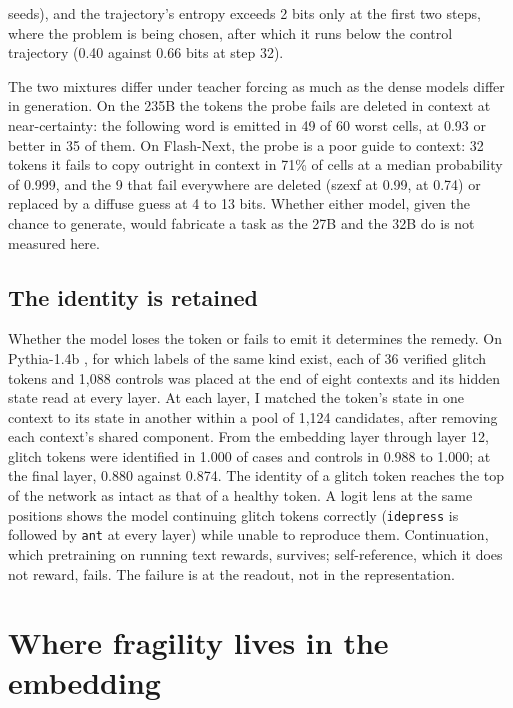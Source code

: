 \documentclass[11pt]{article}
\begin{document}
seeds), and the trajectory's entropy exceeds 2 bits only at the first two steps, where the problem is being chosen, after which it runs below the control trajectory (0.40 against 0.66 bits at step 32).

The two mixtures differ under teacher forcing as much as the dense models differ in generation. On the 235B the tokens the probe fails are deleted in context at near-certainty: the following word is emitted in 49 of 60 worst cells, at 0.93 or better in 35 of them. On Flash-Next, the probe is a poor guide to context: 32 tokens it fails to copy outright in context in 71\% of cells at a median probability of 0.999, and the 9 that fail everywhere are deleted (szexf at 0.99,\texttt{} at 0.74) or replaced by a diffuse guess at 4 to 13 bits. Whether either model, given the chance to generate, would fabricate a task as the 27B and the 32B do is not measured here.

\subsection{The identity is retained}\label{the-identity-is-retained}

Whether the model loses the token or fails to emit it determines the remedy. On Pythia-1.4b \citep{biderman2023}, for which labels of the same kind exist, each of 36 verified glitch tokens and 1,088 controls was placed at the end of eight contexts and its hidden state read at every layer. At each layer, I matched the token's state in one context to its state in another within a pool of 1,124 candidates, after removing each context's shared component. From the embedding layer through layer 12, glitch tokens were identified in 1.000 of cases and controls in 0.988 to 1.000; at the final layer, 0.880 against 0.874. The identity of a glitch token reaches the top of the network as intact as that of a healthy token. A logit lens at the same positions shows the model continuing glitch tokens correctly (\texttt{idepress} is followed by \texttt{ant} at every layer) while unable to reproduce them. Continuation, which pretraining on running text rewards, survives; self-reference, which it does not reward, fails. The failure is at the readout, not in the representation.

\section{Where fragility lives in the embedding}\label{where-fragility-lives-in-the-embedding}
\end{document}
